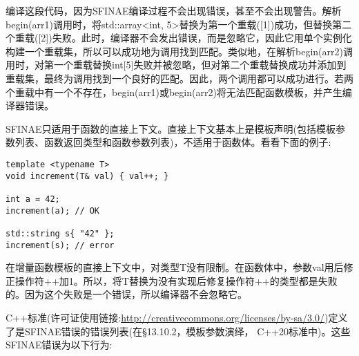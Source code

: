 编译这段代码，因为SFINAE编译过程不会出现错误，甚至不会出现警告。解析begin(arr1)调用时，将std::array<int, 5>替换为第一个重载([1])成功，但替换第二个重载([2])失败。此时，编译器不会发出错误，而是忽略它，因此它用单个实例化构建一个重载集，所以可以成功地为调用找到匹配。类似地，在解析begin(arr2)调用时，对第一个重载替换int[5]失败并被忽略，但对第二个重载替换成功并添加到重载集，最终为调用找到一个良好的匹配。因此，两个调用都可以成功进行。若两个重载中有一个不存在，begin(arr1)或begin(arr2)将无法匹配函数模板，并产生编译器错误。

SFINAE只适用于函数的直接上下文。直接上下文基本上是模板声明(包括模板参数列表、函数返回类型和函数参数列表)，不适用于函数体。看看下面的例子:

\begin{lstlisting}[style=styleCXX]
template <typename T>
void increment(T& val) { val++; }

int a = 42;
increment(a); // OK

std::string s{ "42" };
increment(s); // error
\end{lstlisting}

在增量函数模板的直接上下文中，对类型T没有限制。在函数体中，参数val用后修正操作符++加1。所以，将T替换为没有实现后修复操作符++的类型都是失败的。因为这个失败是一个错误，所以编译器不会忽略它。

C++标准(许可证使用链接:\url{http://creativecommons.org/licenses/by-sa/3.0/})定义了是SFINAE错误的错误列表(在§13.10.2，模板参数演绎，
C++20标准中)。这些SFINAE错误为以下行为:


